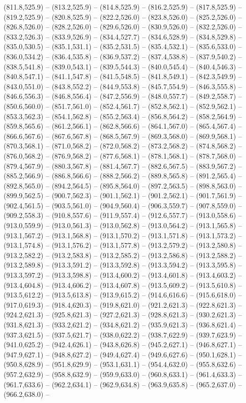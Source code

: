 (811.8,525.9) -- (813.2,525.9) -- (814.8,525.9) -- (816.2,525.9) -- (817.8,525.9) -- (819.2,525.9) -- (820.8,525.9) -- (822.2,526.0) -- (823.8,526.0) -- (825.2,526.0) -- (826.8,526.0) -- (828.2,526.0) -- (829.6,526.0) -- (830.9,526.0) -- (832.2,526.0) -- (833.2,526.3) -- (833.9,526.9) -- (834.4,527.7) -- (834.6,528.9) -- (834.8,529.8) -- (835.0,530.5) -- (835.1,531.1) -- (835.2,531.5) -- (835.4,532.1) -- (835.6,533.0) -- (836.0,534.2) -- (836.4,535.8) -- (836.9,537.2) -- (837.4,538.8) -- (837.9,540.2) -- (838.5,541.8) -- (839.0,543.1) -- (839.5,544.3) -- (840.0,545.4) -- (840.4,546.3) -- (840.8,547.1) -- (841.1,547.8) -- (841.5,548.5) -- (841.8,549.1) -- (842.3,549.9) -- (843.0,551.0) -- (843.8,552.2) -- (844.9,553.8) -- (845.7,554.9) -- (846.3,555.8) -- (846.6,556.3) -- (846.8,556.4) -- (847.2,556.9) -- (848.0,557.7) -- (849.2,558.7) -- (850.6,560.0) -- (851.7,561.0) -- (852.4,561.7) -- (852.8,562.1) -- (852.9,562.1) -- (853.3,562.3) -- (854.1,562.8) -- (855.2,563.4) -- (856.8,564.2) -- (858.2,564.9) -- (859.8,565.6) -- (861.2,566.1) -- (862.8,566.6) -- (864.1,567.0) -- (865.4,567.4) -- (866.6,567.6) -- (867.6,567.8) -- (868.5,567.9) -- (869.3,568.0) -- (869.9,568.1) -- (870.3,568.1) -- (871.0,568.2) -- (872.0,568.2) -- (873.2,568.2) -- (874.8,568.2) -- (876.0,568.2) -- (876.9,568.2) -- (877.6,568.1) -- (878.1,568.1) -- (878.7,568.0) -- (879.4,567.9) -- (880.3,567.8) -- (881.4,567.7) -- (882.6,567.5) -- (883.9,567.2) -- (885.2,566.9) -- (886.8,566.6) -- (888.2,566.2) -- (889.8,565.8) -- (891.2,565.4) -- (892.8,565.0) -- (894.2,564.5) -- (895.8,564.0) -- (897.2,563.5) -- (898.8,563.0) -- (899.9,562.5) -- (900.7,562.3) -- (901.1,562.1) -- (901.2,562.1) -- (901.7,561.9) -- (902.4,561.5) -- (903.5,561.0) -- (904.9,560.4) -- (906.3,559.7) -- (907.8,559.0) -- (909.2,558.3) -- (910.8,557.6) -- (911.9,557.4) -- (912.6,557.7) -- (913.0,558.6) -- (913.0,559.9) -- (913.0,561.3) -- (913.0,562.8) -- (913.0,564.2) -- (913.1,565.8) -- (913.1,567.2) -- (913.1,568.8) -- (913.1,570.2) -- (913.1,571.8) -- (913.1,573.2) -- (913.1,574.8) -- (913.1,576.2) -- (913.1,577.8) -- (913.2,579.2) -- (913.2,580.8) -- (913.2,582.2) -- (913.2,583.8) -- (913.2,585.2) -- (913.2,586.8) -- (913.2,588.2) -- (913.2,589.8) -- (913.3,591.2) -- (913.3,592.8) -- (913.3,594.2) -- (913.3,595.8) -- (913.3,597.2) -- (913.3,598.8) -- (913.4,600.2) -- (913.4,601.8) -- (913.4,603.2) -- (913.4,604.8) -- (913.4,606.2) -- (913.4,607.8) -- (913.5,609.2) -- (913.5,610.8) -- (913.5,612.2) -- (913.5,613.8) -- (913.9,615.2) -- (914.6,616.6) -- (915.6,618.0) -- (917.0,619.3) -- (918.4,620.3) -- (919.8,621.0) -- (921.2,621.3) -- (922.8,621.3) -- (924.2,621.3) -- (925.8,621.3) -- (927.2,621.3) -- (928.8,621.3) -- (930.2,621.3) -- (931.8,621.3) -- (933.2,621.2) -- (934.8,621.2) -- (935.9,621.3) -- (936.8,621.4) -- (937.3,621.5) -- (937.5,621.7) -- (938.0,622.2) -- (938.7,622.9) -- (939.7,623.9) -- (941.0,625.2) -- (942.4,626.1) -- (943.8,626.8) -- (945.2,627.1) -- (946.8,627.1) -- (947.9,627.1) -- (948.8,627.2) -- (949.4,627.4) -- (949.6,627.6) -- (950.1,628.1) -- (950.8,628.9) -- (951.8,629.9) -- (953.1,631.1) -- (954.4,632.0) -- (955.8,632.6) -- (957.2,632.9) -- (958.8,632.9) -- (959.9,633.0) -- (960.8,633.1) -- (961.4,633.3) -- (961.7,633.6) -- (962.2,634.1) -- (962.9,634.8) -- (963.9,635.8) -- (965.2,637.0) -- (966.2,638.0) -- 